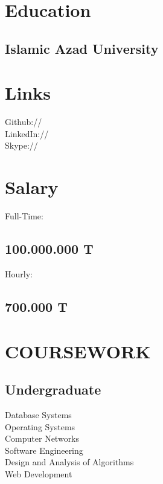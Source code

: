 \documentclass[]{deedy-resume-openfont}
\begin{document}
\begin{minipage}[t]{0.33\textwidth} 


\section{Education}
\subsection{Islamic Azad University}
\sectionsep


\section{Links} 
Github:// \href{https://github.com/parsidev}{} \\
LinkedIn://  \href{https://www.linkedin.com/in/m-parsa}{} \\
Skype:// \href{https://join.skype.com/invite/Nm3knkyse7cd}{} \\
\sectionsep


\section{Salary}
    Full-Time: \subsection{100.000.000 T}
    Hourly: \subsection{700.000 T}
\sectionsep

\section{COURSEWORK}
\subsection{Undergraduate}
Database Systems \\
Operating Systems \\
Computer Networks \\
Software Engineering \\
Design and Analysis of Algorithms \\
Web Development \\
\sectionsep




\end{minipage}
\end{document}
